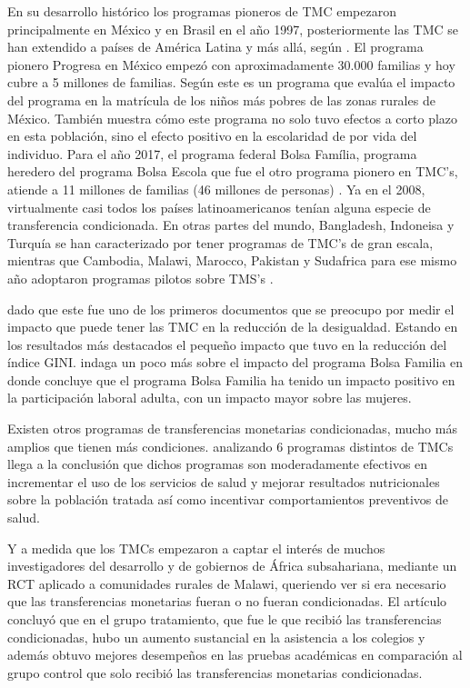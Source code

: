 \documentclass[AER]{AEA}
\begin{document}
En su desarrollo histórico los programas pioneros de TMC empezaron principalmente en México y en Brasil en el año 1997, posteriormente las TMC se han extendido a países de América Latina y más allá, según \cite{Sugiyama2011TheAmericas}. El programa pionero Progresa en México empezó con aproximadamente 30.000 familias y hoy cubre a 5 millones de familias. Según \cite{Schultz2004SchoolProgram} este es un programa que evalúa el impacto del programa en la matrícula de los niños más pobres de las zonas rurales de México. También muestra cómo este programa no solo tuvo efectos a corto plazo en esta población, sino el efecto positivo en la escolaridad de por vida del individuo. Para el año 2017, el programa federal Bolsa Família, programa heredero del programa Bolsa Escola que fue el otro programa pionero en TMC's, atiende a 11 millones de familias (46 millones de personas) \citep{Fiszbein2009ConditionalReport}. Ya en el 2008, virtualmente casi todos los países latinoamericanos tenían alguna especie de transferencia condicionada. En otras partes del mundo, Bangladesh, Indoneisa y Turquía se han caracterizado por tener programas de TMC's de gran escala, mientras que Cambodia, Malawi, Marocco, Pakistan y Sudafrica para ese mismo año adoptaron programas pilotos sobre TMS's \citep{Fiszbein2009ConditionalReport}.

\cite{Soares2007ConditionalPaper} dado que este fue uno de los primeros documentos que se preocupo por medir el impacto que puede tener las TMC en la reducción de la desigualdad. Estando en los resultados más destacados el pequeño impacto que tuvo en la reducción del índice GINI.\cite{Soares2010EvaluatingPerspective} indaga un poco más sobre el impacto del programa Bolsa Familia en donde concluye que el programa Bolsa Familia ha tenido un impacto positivo en la participación laboral adulta, con un impacto mayor sobre las mujeres.

Existen otros programas de transferencias monetarias condicionadas, mucho más amplios que tienen más condiciones. \cite{Lagarde2007ConditionalReview} analizando 6 programas distintos de TMCs llega a la conclusión que dichos programas son moderadamente efectivos en incrementar el uso de los servicios de salud y mejorar resultados nutricionales sobre la población tratada así como incentivar comportamientos preventivos de salud. 

Y a medida que los TMCs empezaron a captar el interés de muchos investigadores del desarrollo y de gobiernos de África subsahariana, \cite{Baird2011} mediante un RCT aplicado a comunidades rurales de Malawi, queriendo ver si era necesario que las transferencias monetarias fueran o no fueran condicionadas. El artículo concluyó que en el grupo tratamiento, que fue le que recibió las transferencias condicionadas, hubo un aumento sustancial en la asistencia a los colegios y además obtuvo mejores desempeños en las pruebas académicas en comparación al grupo control que solo recibió las transferencias monetarias condicionadas. 
\end{document}
